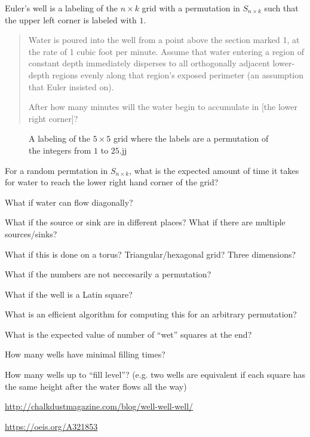 \documentclass{article}
\begin{document}
Euler's well is a labeling of the $n \times k$ grid with a permutation in
$S_{n \times k}$ such that the upper left corner is labeled with $1$.
\begin{quote}
  Water is poured into the well from a point above the section marked 1, at the rate of 1 cubic foot per minute. Assume that water entering a region of constant depth immediately disperses to all orthogonally adjacent lower-depth regions evenly along that region’s exposed perimeter (an assumption that Euler insisted on).

After how many minutes will the water begin to accumulate in
[the lower right corner]?
\end{quote}

\begin{figure}[ht!]
  \centering
  \caption{
    A labeling of the $5 \times 5$ grid where the labels are a permutation of
    the integers from $1$ to $25$.jj
  }
\end{figure}
\begin{question}
  For a random permtation in $S_{n \times k}$, what is the expected amount of
  time it takes for water to reach the lower right hand corner of the grid?
\end{question}

\begin{related}
  \item What if water can flow diagonally?
  \item What if the source or sink are in different places? What if there are
  multiple sources/sinks?
  \item What if this is done on a torus? Triangular/hexagonal grid? Three
  dimensions?
  \item What if the numbers are not neccesarily a permutation?
  \item What if the well is a Latin square?
  \item What is an efficient algorithm for computing this for an arbitrary
  permutation?
  \item What is the expected value of number of ``wet'' squares at the end?
  \item How many wells have minimal filling times?
  \item How many wells up to ``fill level''? (e.g. two wells are equivalent if
  each square has the same height after the water flows all the way)
\end{related}

\begin{references}
  \item \url{http://chalkdustmagazine.com/blog/well-well-well/}
  \item \url{https://oeis.org/A321853}
\end{references}
\end{document}
